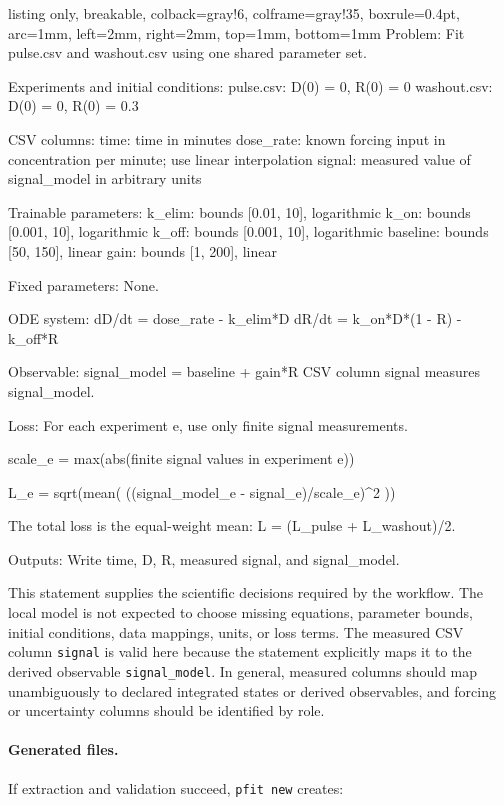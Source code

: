 \begin{tcblisting}{
  listing only,
  breakable,
  colback=gray!6,
  colframe=gray!35,
  boxrule=0.4pt,
  arc=1mm,
  left=2mm,
  right=2mm,
  top=1mm,
  bottom=1mm
}
Problem:
Fit pulse.csv and washout.csv using one shared parameter set.

Experiments and initial conditions:
pulse.csv:   D(0) = 0, R(0) = 0
washout.csv: D(0) = 0, R(0) = 0.3

CSV columns:
time: time in minutes
dose_rate: known forcing input in concentration per minute;
           use linear interpolation
signal: measured value of signal_model in arbitrary units

Trainable parameters:
k_elim:   bounds [0.01, 10], logarithmic
k_on:     bounds [0.001, 10], logarithmic
k_off:    bounds [0.001, 10], logarithmic
baseline: bounds [50, 150], linear
gain:     bounds [1, 200], linear

Fixed parameters:
None.

ODE system:
dD/dt = dose_rate - k_elim*D
dR/dt = k_on*D*(1 - R) - k_off*R

Observable:
signal_model = baseline + gain*R
CSV column signal measures signal_model.

Loss:
For each experiment e, use only finite signal measurements.

scale_e = max(abs(finite signal values in experiment e))

L_e = sqrt(mean(
    ((signal_model_e - signal_e)/scale_e)^2
))

The total loss is the equal-weight mean:
L = (L_pulse + L_washout)/2.

Outputs:
Write time, D, R, measured signal, and signal_model.
\end{tcblisting}

This statement supplies the scientific decisions required by the workflow. The
local model is not expected to choose missing equations, parameter bounds,
initial conditions, data mappings, units, or loss terms. The measured CSV column
\texttt{signal} is valid here because the statement explicitly maps it to the
derived observable \texttt{signal\_model}. In general, measured columns should
map unambiguously to declared integrated states or derived observables, and
forcing or uncertainty columns should be identified by role.

\paragraph{Generated files.}
If extraction and validation succeed, \texttt{pfit new} creates:

